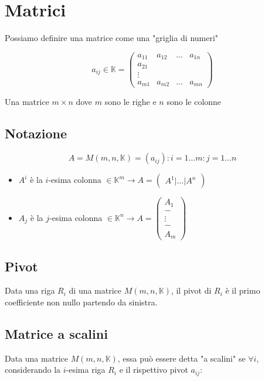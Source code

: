 \documentclass{subfiles}
\begin{document}
\section{Matrici}

Possiamo definire una matrice come una "griglia di numeri"

$$
a_{ij} \in \mathbb{K} =
\begin{pmatrix}
a_{11} & a_{12} & \dots & a_{1n}\\
a_{21}\\
\vdots\\
a_{m1} & a_{m2} & \dots & a_{mn}
\end{pmatrix}
$$

\noindent
Una matrice $m \times n$ dove $m$ sono le righe e $n$ sono le colonne

\subsection{Notazione}

$$
A = M(m,n,\mathbb{K}) = (a_{ij}) : i = 1 \dots m : j = 1 \dots n
$$

\begin{itemize}
	\item $A^i$ è la $i$-esima colonna $\in \mathbb{K}^m \to A = \begin{pmatrix} A^1 | \dots | A^n \end{pmatrix}$
	\item $A_j$ è la $j$-esima colonna $\in \mathbb{K}^n \to A = \begin{pmatrix} A_1 \\ - \\ \vdots \\ - \\ A_m \end{pmatrix}$
\end{itemize}

\subsection{Pivot}

Data una riga $R_i$ di una matrice $M(m,n,\mathbb{K})$, il pivot di $R_i$ è il primo coefficiente non nullo partendo da sinistra.

\subsection{Matrice a scalini}

Data una matrice $M(m,n,\mathbb{K})$, essa può essere detta "a scalini" se $\forall i$, considerando la $i$-esima riga $R_i$ e il rispettivo pivot $a_{ij}$:
\end{document}
